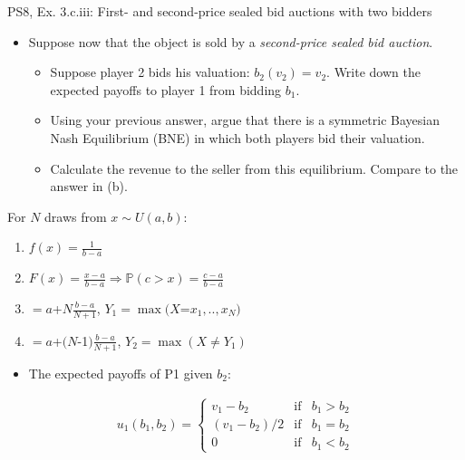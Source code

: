 \begin{frame}{PS8, Ex. 3.c.iii: First- and second-price sealed bid auctions with two bidders}
    \begin{multicols}{2}
      \begin{itemize}
        \item[(c)] Suppose now that the object is sold by a \textit{second-price sealed bid auction}.
        \begin{itemize}\normalsize
          \item[i.]   Suppose player 2 bids his valuation: $b_2(v_2) = v_2$. Write down the expected payoffs to player 1 from bidding $b_1$.
          \item[ii.]  Using your previous answer, argue that there is a symmetric Bayesian Nash Equilibrium (BNE) in which both players bid their valuation.
          \item[iii.] Calculate the revenue to the seller from this equilibrium. Compare to the answer in (b).
        \end{itemize}
      \end{itemize}
      For $N$ draws from $x\sim U(a, b):$
      \vspace{-6pt}
      \begin{enumerate}
        \item[PDF:] $f(x)=\frac{1}{b-a}$
        \item[CDF:] $F(x)=\frac{x-a}{b-a}\Rightarrow\mathbb{P}(c>x)=\frac{c-a}{b-a}$
        \item[$\mathbb{E}(Y_1)$] $=a$+$N\frac{b-a}{N+1}$, $Y_1=\max(X$=$x_1,..,x_N)$
        \item[$\mathbb{E}(Y_2)$] $=a$+$(N$-1$)\frac{b-a}{N+1}$, $Y_2=\max(X\neq Y_1)$
      \end{enumerate}
      \vfill\null\columnbreak
      \begin{itemize}
        \item[(i)] The expected payoffs of P1 given $b_2$:
      \end{itemize}
      \vspace{-16pt}
      \begin{align*}
        u_1(b_1,b_2)=\left\{\begin{array}{lcl}
          v_1-b_2     & \text{if} & b_1>b_2 \\
          (v_1-b_2)/2 & \text{if} & b_1=b_2 \\
          0           & \text{if} & b_1<b_2
        \end{array}\right.
      \end{align*}

\end{multicols}
\end{frame}
